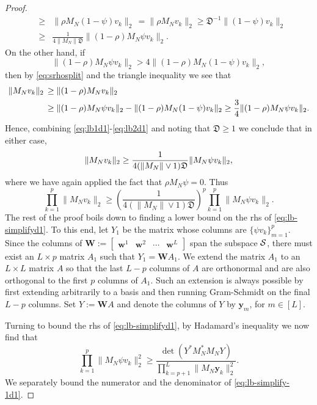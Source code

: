\documentclass{amsart}
\numberwithin{equation}{section}
\def\corAB{}
\def\corOZ{}
\newcommand{\abbr}[1]{{\sc\lowercase{#1}}}
\begin{document}
\begin{proof}
\begin{eqnarray}
  &  \geq&
    \| {\rho} M_N(1-{\psi}) v_k\|_2 \, =   \| {\rho} M_N v_k\|_2 \ge \mathfrak{D}^{-1} \|(1-{\psi})v_k\|_2 \nonumber\\
    &\ge& \frac{1}{\corAB{4}\|M_N\| \mathfrak{D}} \| (1-{\rho}) M_N {\psi} v_k\|_2.
  \end{eqnarray}
  On the other hand, if
    \[
    \| (1-{\rho}) M_N {\psi} v_k\|_2
    >
    \corAB{4} \| (1-{\rho}) M_N (1-{\psi}) v_k\|_2,
  \]
  \corAB{then by \eqref{eq:srhosplit} and the triangle inequality we see that
  \begin{align}\label{eq:lb2d1}
    \|M_N v_k\|_2
  & \,   \geq
    \| (1-{\rho}) M_N v_k\|_2\notag\\
    & \,     \geq
   \| (1-{\rho}) M_N \psi v_k\|_2 - \| (1-{\rho}) M_N (1-\psi) v_k\|_2 \ge
    \frac{3}{4}
   \| (1-{\rho}) M_N \psi v_k\|_2.
  \end{align}}
  Hence, combining \eqref{eq:lb1d1}-\eqref{eq:lb2d1}
  \corAB{and noting that $\mathfrak{D} \ge 1$}
  we conclude that \corOZ{in either case},
  \begin{equation}
    \|M_N v_k\|_2
    \geq
     \frac{1}{\corAB{4(\|M_N\|\vee 1)\mathfrak{D}}} \| M_N {\psi} v_k\|_2, \notag
  \end{equation}
 where we have again applied the fact that ${\rho} M_N {\psi} =0$. Thus \corAB{
 \begin{equation}\label{eq:lb-simplifyd1}
\prod_{k=1}^p   \|M_N v_k\|_2 \ge \left(\frac{1}{4(\|M_N\| \vee 1) \mathfrak{D}}\right)^p \prod_{k=1}^p\| M_N {\psi} v_k\|_2.
 \end{equation}
 }
 \corOZ{The rest of the proof boils down to finding}
 \corAB{a lower bound on the \abbr{RHS} of \eqref{eq:lb-simplifyd1}.}
 \corAB{To this end, let $Y_1$ be the matrix whose columns are $\{{\psi}v_k\}_{m=1}^p$. Since the columns of ${\bm W}:=\begin{bmatrix} {\bm w}^1 & {\bm w}^2 & \cdots & {\bm w}^L \end{bmatrix}$ span the subspace $\mathcal{S}$, there must exist an $L \times p$ matrix $A_1$ such that $Y_1={\bm W} A_1$. We extend the matrix $A_1$ to an $L \times L$ matrix $A$ so that the last $L-p$ columns of $A$ are orthonormal and are also orthogonal to the first $p$ columns of $A_1$. Such an extension is always possible by first extending arbitrarily to a basis and then running Gram-Schmidt on the final $L - p$ columns. Set $Y:={\bm W} A$}
 \corOZ{and denote the columns of $Y$ by ${\bm y}_m$, for $m \in [L]$.}

 \corAB{Turning to bound the \abbr{RHS} of
 \eqref{eq:lb-simplifyd1}, by Hadamard's inequality we now find that
\begin{equation}\label{eq:lb-simplify-1d1}
\prod_{k=1}^p\| {M}_N {\psi} v_k\|_2^2 \ge \frac{\det(Y^* {M}_{N}^* {M}_{N} Y)}{\prod_{k=p+1}^L \|{M}_{N}{\bm y}_k\|_2^2}.
\end{equation}
We separately bound the numerator and the denominator of \eqref{eq:lb-simplify-1d1}.}


\end{proof}
\end{document}
